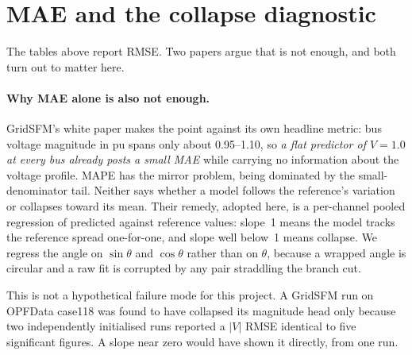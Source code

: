 \documentclass[10pt]{article}
\begin{document}
\section{MAE and the collapse diagnostic}
\label{sec:diag}

The tables above report RMSE. Two papers argue that is not enough, and both
turn out to matter here.

\paragraph{Why MAE alone is also not enough.} GridSFM's white paper makes the
point against its own headline metric: bus voltage magnitude in pu spans only
about 0.95--1.10, so \emph{a flat predictor of $V = 1.0$ at every bus already
posts a small MAE} while carrying no information about the voltage profile.
MAPE has the mirror problem, being dominated by the small-denominator tail.
Neither says whether a model follows the reference's variation or collapses
toward its mean. Their remedy, adopted here, is a per-channel pooled regression
of predicted against reference values: slope~1 means the model tracks the
reference spread one-for-one, and slope well below~1 means collapse. We regress
the angle on $\sin\theta$ and $\cos\theta$ rather than on $\theta$, because a
wrapped angle is circular and a raw fit is corrupted by any pair straddling the
branch cut.

This is not a hypothetical failure mode for this project. A GridSFM run on
OPFData case118 was found to have collapsed its magnitude head only because two
independently initialised runs reported a $|V|$ RMSE identical to five
significant figures. A slope near zero would have shown it directly, from one
run.
\end{document}
